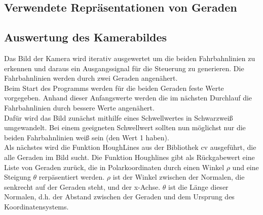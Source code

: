 \documentclass[a4paper,12pt]{article}
\begin{document}
	\subsection{Verwendete Repräsentationen von Geraden}

	\subsection{Auswertung des Kamerabildes}	

	Das Bild der Kamera wird iterativ ausgewertet um die beiden Fahrbahnlinien zu erkennen und daraus ein Ausgangssignal für die Steuerung zu generieren. Die Fahrbahnlinien werden durch zwei Geraden angenähert. \\ 
	Beim Start des Programms werden für die beiden Geraden feste Werte vorgegeben. Anhand dieser Anfangswerte werden die im nächsten Durchlauf die Fahrbahnlinien durch bessere Werte angenähert.\\
	Dafür wird das Bild zunächst mithilfe eines Schwellwertes in Schwarzweiß umgewandelt. Bei einem geeigneten Schwellwert sollten nun möglichst nur die beiden Fahrbahnlinien weiß sein (den Wert 1 haben).\\
	Als nächstes wird die Funktion HoughLines aus der Bibliothek cv ausgeführt, die alle Geraden im Bild sucht. Die Funktion Houghlines gibt als Rückgabewert eine Liste von Geraden zurück, die in Polarkoordinaten durch einen Winkel $\rho$ und eine Steigung $\theta$ rerpäsentiert werden. $\rho$ ist der Winkel zwischen der Normalen, die senkrecht auf der Geraden steht, und der x-Achse. $\theta$ ist die Länge dieser Normalen, d.h. der Abstand zwischen der Geraden und dem Ursprung des Koordinatensystems.


\end{document}
